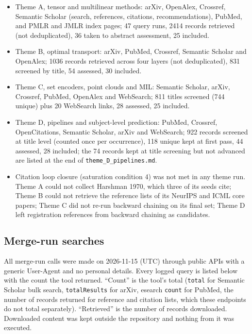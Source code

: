 \documentclass[journal,onecolumn]{IEEEtran}
\begin{document}
\begin{itemize}

\item{} Theme A, tensor and multilinear methods: arXiv, OpenAlex, Crossref, Semantic Scholar (search, references, citations, recommendations), PubMed, and PMLR and JMLR index pages; 47 query runs, 2414 records retrieved (not deduplicated), 36 taken to abstract assessment, 25 included.

\item{} Theme B, optimal transport: arXiv, PubMed, Crossref, Semantic Scholar and OpenAlex; 1036 records retrieved across four layers (not deduplicated), 831 screened by title, 54 assessed, 30 included.

\item{} Theme C, set encoders, point clouds and MIL: Semantic Scholar, arXiv, Crossref, PubMed, OpenAlex and WebSearch; 811 titles screened (744 unique) plus 20 WebSearch links, 28 assessed, 25 included.

\item{} Theme D, pipelines and subject-level prediction: PubMed, Crossref, OpenCitations, Semantic Scholar, arXiv and WebSearch; 922 records screened at title level (counted once per occurrence), 118 unique kept at first pass, 44 assessed, 28 included; the 74 records kept at title screening but not advanced are listed at the end of \nolinkurl{theme_D_pipelines.md}.

\item{} Citation loop closure (saturation condition 4) was not met in any theme run. Theme A could not collect Harshman 1970, which three of its seeds cite; Theme B could not retrieve the reference lists of its NeurIPS and ICML core papers; Theme C did not re-run backward chaining on its final set; Theme D left registration references from backward chaining as candidates.

\end{itemize}

\subsection{Merge-run searches}

All merge-run calls were made on 2026-11-15 (UTC) through public APIs with a generic User-Agent and no personal details. Every logged query is listed below with the count the tool returned. ``Count'' is the tool's total (\texttt{total} for Semantic Scholar bulk search, \texttt{totalResults} for arXiv, esearch \texttt{count} for PubMed, the number of records returned for reference and citation lists, which these endpoints do not total separately). ``Retrieved'' is the number of records downloaded. Downloaded content was kept outside the repository and nothing from it was executed.
\end{document}
